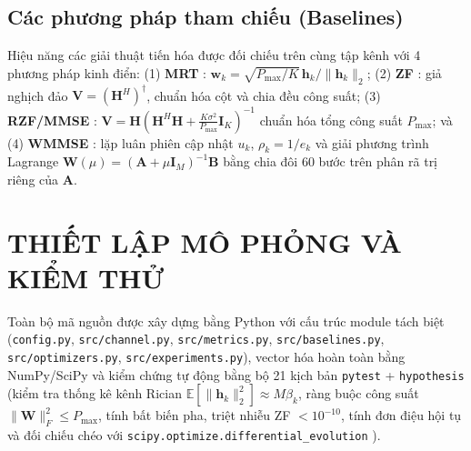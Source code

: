 \documentclass[12pt, a4paper]{article}
\begin{document}
\subsection{Các phương pháp tham chiếu (Baselines)}
Hiệu năng các giải thuật tiến hóa được đối chiếu trên cùng tập kênh với 4 phương pháp kinh điển:
(1) \textbf{MRT} \cite{lo1999}: $\mathbf{w}_k = \sqrt{P_{\max}/K}\,\mathbf{h}_k/\|\mathbf{h}_k\|_2$;
(2) \textbf{ZF} \cite{spencer2004}: giả nghịch đảo $\mathbf{V} = (\mathbf{H}^H)^\dagger$, chuẩn hóa cột và chia đều công suất;
(3) \textbf{RZF/MMSE} \cite{peel2005}: $\mathbf{V} = \mathbf{H}(\mathbf{H}^H\mathbf{H} + \frac{K\sigma^2}{P_{\max}}\mathbf{I}_K)^{-1}$ chuẩn hóa tổng công suất $P_{\max}$; và
(4) \textbf{WMMSE} \cite{shi2011}: lặp luân phiên cập nhật $u_k$, $\rho_k = 1/e_k$ và giải phương trình Lagrange $\mathbf{W}(\mu) = (\mathbf{A} + \mu\mathbf{I}_M)^{-1}\mathbf{B}$ bằng chia đôi 60 bước trên phân rã trị riêng của $\mathbf{A}$.

\section{THIẾT LẬP MÔ PHỎNG VÀ KIỂM THỬ}
Toàn bộ mã nguồn được xây dựng bằng Python với cấu trúc module tách biệt (\texttt{config.py}, \texttt{src/channel.py}, \texttt{src/metrics.py}, \texttt{src/baselines.py}, \texttt{src/optimizers.py}, \texttt{src/experiments.py}), vector hóa hoàn toàn bằng NumPy/SciPy và kiểm chứng tự động bằng bộ 21 kịch bản \texttt{pytest} + \texttt{hypothesis} (kiểm tra thống kê kênh Rician $\mathbb{E}[\|\mathbf{h}_k\|_2^2] \approx M\beta_k$, ràng buộc công suất $\|\mathbf{W}\|_F^2 \le P_{\max}$, tính bất biến pha, triệt nhiễu ZF $< 10^{-10}$, tính đơn điệu hội tụ và đối chiếu chéo với \texttt{scipy.optimize.differential\_evolution} \cite{virtanen2020}).
\end{document}
